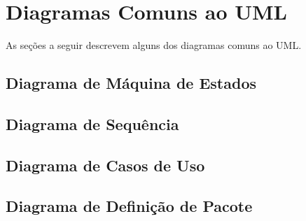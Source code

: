 \section{Diagramas Comuns ao UML}
As seções a seguir descrevem alguns dos diagramas comuns ao UML.

\subsection{Diagrama de Máquina de Estados}


\subsection{Diagrama de Sequência}


\subsection{Diagrama de Casos de Uso}


\subsection{Diagrama de Definição de Pacote}

